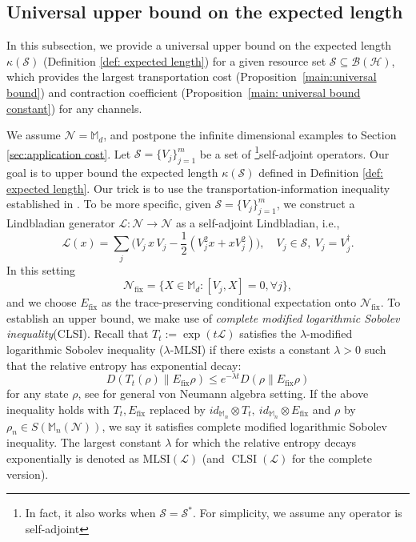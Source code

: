 \documentclass[11pt,reqno]{amsart}
\numberwithin{equation}{section}
\DeclareMathOperator{\CLSI}{\text{CLSI}}
\newcommand{\mb}{\mathbb}
\newcommand{\mc}{\mathcal}
\newcommand{\fix}{\mathrm{fix}}
\begin{document}
\subsection{Universal upper bound on the expected length}
In this subsection, we provide a universal upper bound on the expected length $\kappa(\mc S)$ (Definition \ref{def: expected length}) for a given resource set $\mc S \subseteq \mc B(\mc H)$, which provides the largest transportation cost (Proposition~\ref{main:universal bound}) and contraction coefficient (Proposition~\ref{main: universal bound constant}) for any channels. 

We assume $\mc N= \mb M_d$, and postpone the infinite dimensional examples to Section \ref{sec:application cost}. Let $\mc S = \{V_j\}_{j=1}^m$ be a set of \footnote{In fact, it also works when $\mc S = \mc S^*$. For simplicity, we assume any operator is self-adjoint}{self-adjoint operators}. Our goal is to upper bound the expected length $\kappa(\mc S)$ defined in Definition \ref{def: expected length}. Our trick is to use the transportation-information inequality established in \cite{Fisher}. To be more specific, given $\mc S = \{V_j\}_{j=1}^m$, we construct a Lindbladian generator $\mc L:\mc N \to \mc N $ as a self-adjoint Lindbladian, i.e., 
\begin{equation}\label{Lindblad: continuous}
\mc L(x) = \sum_{j}\big(V_j\,x\, V_j - \frac{1}{2}(V_j^2x+xV_j^2)\big),\quad V_j \in \mc S,\ V_j = V_j^\dagger.
\end{equation}
In this setting 
\begin{equation}
    \mc N_{\fix} = \{X\in \mb M_d: [V_j,X]=0, \forall j\}, 
\end{equation}
and we choose $E_{\fix}$ as the trace-preserving conditional expectation onto $\mc N_{\fix}$. To establish an upper bound, we make use of \textit{complete modified logarithmic Sobolev inequality}(CLSI). Recall that $T_t:=\exp(t\mc L)$ satisfies the $\lambda$-modified logarithmic Sobolev inequality ($\lambda$-MLSI) if there exists a constant $\lambda > 0$ such that the relative entropy has exponential decay:
	\begin{equation}
		D(T_t(\rho) \| E_{\fix}\rho) \leq e^{-\lambda t}D(\rho \| E_{\fix}\rho)
	\end{equation}
for any state $\rho$, see \cite{wirth2025} for general von Neumann algebra setting. If the above inequality holds with $T_t,E_\fix$ replaced by $id_{\mb M_n} \otimes T_t,\ id_{\mb M_n} \otimes E_\fix$ and $\rho$ by $\rho_n \in S(\mb M_n(\mc N))$, we say it satisfies complete modified logarithmic Sobolev inequality. The largest constant $\lambda$ for which the relative entropy decays exponentially is denoted as $\text{MLSI}(\mc L)$ (and $\CLSI(\mc L)$ for the complete version).
 
\end{document}
